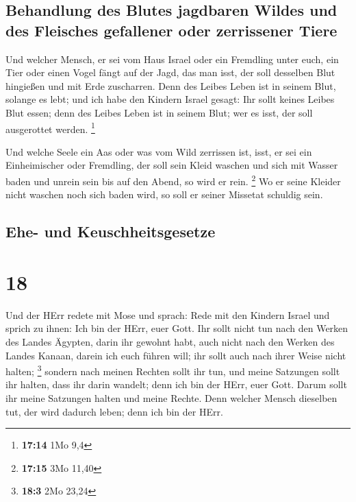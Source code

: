 \hypertarget{behandlung-des-blutes-jagdbaren-wildes-und-des-fleisches-gefallener-oder-zerrissener-tiere}{%
\subsection{Behandlung des Blutes jagdbaren Wildes und des Fleisches
gefallener oder zerrissener
Tiere}\label{behandlung-des-blutes-jagdbaren-wildes-und-des-fleisches-gefallener-oder-zerrissener-tiere}}

 Und welcher Mensch, er sei vom Haus Israel oder ein
Fremdling unter euch, ein Tier oder einen Vogel fängt auf der Jagd, das
man isst, der soll desselben Blut hingießen und mit Erde zuscharren.
 Denn des Leibes Leben ist in seinem Blut, solange es
lebt; und ich habe den Kindern Israel gesagt: Ihr sollt keines Leibes
Blut essen; denn des Leibes Leben ist in seinem Blut; wer es isst, der
soll ausgerottet werden. \footnote{\textbf{17:14} 1Mo 9,4}

 Und welche Seele ein Aas oder was vom Wild zerrissen
ist, isst, er sei ein Einheimischer oder Fremdling, der soll sein Kleid
waschen und sich mit Wasser baden und unrein sein bis auf den Abend, so
wird er rein. \footnote{\textbf{17:15} 3Mo 11,40}  Wo er
seine Kleider nicht waschen noch sich baden wird, so soll er seiner
Missetat schuldig sein.

\hypertarget{ehe--und-keuschheitsgesetze}{%
\subsection{Ehe- und
Keuschheitsgesetze}\label{ehe--und-keuschheitsgesetze}}

\hypertarget{section-17}{%
\section{18}\label{section-17}}

 Und der HErr redete mit Mose und sprach: 
Rede mit den Kindern Israel und sprich zu ihnen: Ich bin der HErr, euer
Gott.  Ihr sollt nicht tun nach den Werken des Landes
Ägypten, darin ihr gewohnt habt, auch nicht nach den Werken des Landes
Kanaan, darein ich euch führen will; ihr sollt auch nach ihrer Weise
nicht halten; \footnote{\textbf{18:3} 2Mo 23,24}  sondern
nach meinen Rechten sollt ihr tun, und meine Satzungen sollt ihr halten,
dass ihr darin wandelt; denn ich bin der HErr, euer Gott. 
Darum sollt ihr meine Satzungen halten und meine Rechte. Denn welcher
Mensch dieselben tut, der wird dadurch leben; denn ich bin der HErr.

